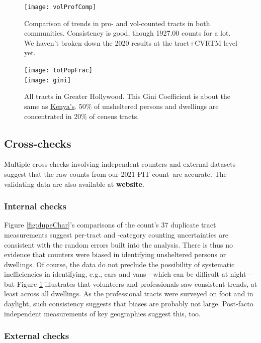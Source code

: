 \documentclass[11pt,twocolumn]{article}
\def\bfr{\bf\color{red}}
\def\Count{count}
\begin{document}
\begin{figure}[t]
	\centering
	\texttt{[image: volProfComp]}
	\caption{Comparison of trends in pro- and vol-counted tracts in both communities.
			Consistency is good, though 1927.00 counts for a lot. We haven't
			broken down the 2020 results at the tract+CVRTM level yet.}
	\label{fig:proVolComp}
\end{figure}

\begin{figure}[t]
	\centering
	\texttt{[image: totPopFrac]}\\
	\texttt{[image: gini]}
	\caption{All tracts in Greater Hollywood. This Gini Coefficient
			is about the same as 
			\href{https://en.wikipedia.org/wiki/List_of_countries_by_income_equality}{Kenya's}.
			50\% of unsheltered persons and dwellings are concentrated in 20\% of census
			tracts.}
	\label{fig:gini}
\end{figure}

\subsection{Cross-checks}
\label{sec:crossChecks}

Multiple cross-checks involving independent counters and external datasets suggest 
that the raw counts from our 2021 PIT \Count\ are accurate. The validating data are also
available at {\bfr website}.

\subsubsection{Internal checks}

Figure \ref{fig:dupeChar}'s comparisons of the count's 37 duplicate tract measurements suggest 
per-tract and -category counting uncertainties are consistent with the random errors built into the analysis. 
There is thus no evidence that counters were biased in identifying unsheltered persons or dwellings. 
Of course, the data do not preclude the possibility of systematic inefficiencies in identifying, e.g., cars and 
vans---which can be difficult at night---but Figure \ref{fig:proVolComp} illustrates that volunteers and 
professionals saw consistent trends, at least across all dwellings. As the professional tracts were surveyed 
on foot and in daylight, such consistency suggests that biases are probably not large. Post-facto independent 
measurements of key geographies suggest this, too.

\subsubsection{External checks}
\end{document}
